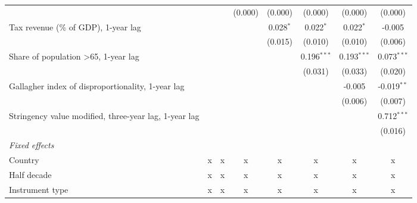 \begin{tabular}{lccccccc}
                                                                          &               &               & (0.000)       & (0.000)      & (0.000)       & (0.000)       & (0.000)\\   
   Tax revenue (\% of GDP), 1-year lag                                    &               &               &               & 0.028$^{*}$  & 0.022$^{*}$   & 0.022$^{*}$   & -0.005\\   
                                                                          &               &               &               & (0.015)      & (0.010)       & (0.010)       & (0.006)\\   
   Share of population >65, 1-year lag                                    &               &               &               &              & 0.196$^{***}$ & 0.193$^{***}$ & 0.073$^{***}$\\   
                                                                          &               &               &               &              & (0.031)       & (0.033)       & (0.020)\\   
   Gallagher index of disproportionality, 1-year lag                      &               &               &               &              &               & -0.005        & -0.019$^{**}$\\   
                                                                          &               &               &               &              &               & (0.006)       & (0.007)\\   
   Stringency value modified, three-year lag, 1-year lag                  &               &               &               &              &               &               & 0.712$^{***}$\\   
                                                                          &               &               &               &              &               &               & (0.016)\\   
   \emph{Fixed effects}\\
   Country                                                                & x             & x             & x             & x            & x             & x             & x\\  
   Half decade                                                            & x             & x             & x             & x            & x             & x             & x\\  
   Instrument type                                                        & x             & x             & x             & x            & x             & x             & x\\  

\end{tabular}
